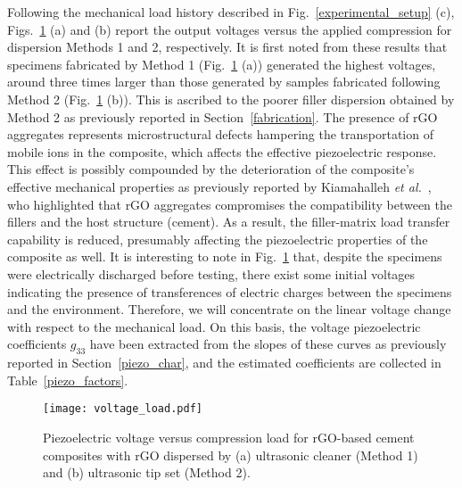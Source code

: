 \documentclass[a4paper,fleqn]{cas-sc}
\begin{document}
Following the mechanical load history described in Fig.~\ref{experimental_setup} (c), Figs.~\ref{voltage_load} (a) and (b) report the output voltages versus the applied compression for dispersion Methods 1 and 2, respectively. It is first noted from these results that specimens fabricated by Method 1 (Fig.~\ref{voltage_load} (a)) generated the highest voltages, around three times larger than those generated by samples fabricated following Method 2 (Fig.~\ref{voltage_load} (b)). This is ascribed to the poorer filler dispersion obtained by Method 2 as previously reported in Section~\ref{fabrication}. The presence of rGO aggregates represents microstructural defects hampering the transportation of mobile ions in the composite, which affects the effective piezoelectric response. This effect is possibly compounded by the deterioration of the composite's effective mechanical properties as previously reported by Kiamahalleh \textit{et al.}~\cite{VALIZADEHKIAMAHALLEH2020118832}, who highlighted that rGO aggregates compromises the compatibility between the fillers and the host structure (cement). As a result, the filler-matrix load transfer capability is reduced, presumably affecting the piezoelectric properties of the composite as well. It is interesting to note in Fig.~\ref{voltage_load} that, despite the specimens were electrically discharged before testing, there exist some initial voltages indicating the presence of transferences of electric charges between the specimens and the environment. Therefore, we will concentrate on the linear voltage change with respect to the mechanical load. On this basis, the voltage piezoelectric coefficients $g_{33}$ have been extracted from the slopes of these curves as previously reported in Section~\ref{piezo_char}, and the estimated coefficients are collected in Table~\ref{piezo_factors}. 

\begin{figure}[ht]
\centering
\texttt{[image: voltage\_load.pdf]}
\caption{Piezoelectric voltage versus compression load for rGO-based cement composites with rGO dispersed by (a) ultrasonic cleaner (Method 1) and (b) ultrasonic tip set (Method 2).
}
\label{voltage_load}
\end{figure}
\end{document}

